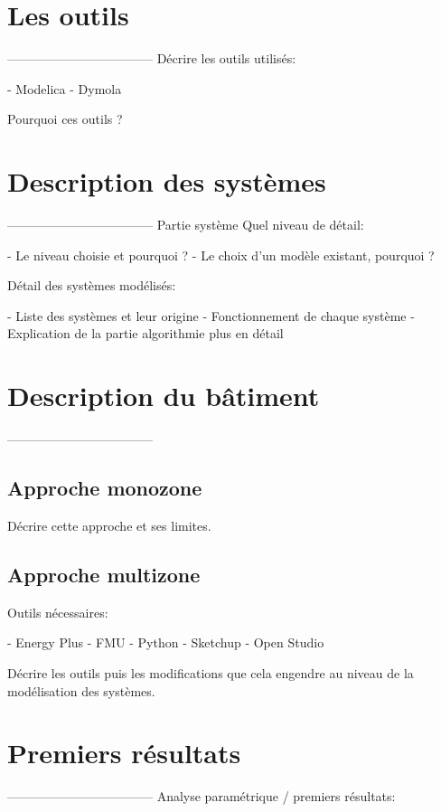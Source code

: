 
\section{Les outils} %
\label{sec:les_outils}
-----------------------------------
Décrire les outils utilisés:

 - Modelica
 - Dymola

Pourquoi ces outils ?


\section{Description des systèmes} %
\label{sec:description_des_systemes}
-----------------------------------
Partie système
Quel niveau de détail:

 - Le niveau choisie et pourquoi ?
 - Le choix d’un modèle existant, pourquoi ?


Détail des systèmes modélisés:

 - Liste des systèmes et leur origine
 - Fonctionnement de chaque système
 - Explication de la partie algorithmie plus en détail


\section{Description du bâtiment} %
\label{sec:description_du_batiment}
-----------------------------------
\subsection{Approche monozone} %
\label{sub:approche_monozone}
Décrire cette approche et ses limites.

\subsection{Approche multizone} %
\label{sub:approche_multizone}
Outils nécessaires:

 - Energy Plus
 - FMU
 - Python
 - Sketchup
 - Open Studio

Décrire les outils puis les modifications que cela engendre au niveau de la modélisation
des systèmes.


\section{Premiers résultats} %
\label{sec:premiers_resultats}
-----------------------------------
Analyse paramétrique / premiers résultats:

